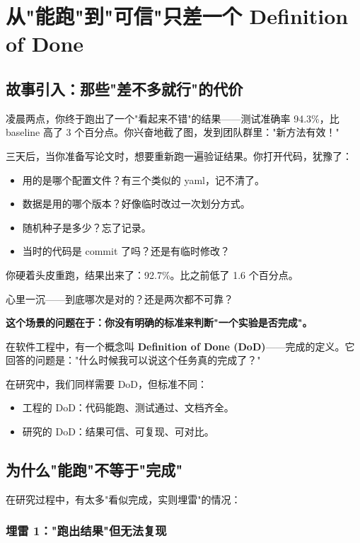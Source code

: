 \chapter{从"能跑"到"可信"只差一个 Definition of Done}
\label{ch:dod}

\section{故事引入：那些"差不多就行"的代价}

凌晨两点，你终于跑出了一个"看起来不错"的结果——测试准确率 94.3\%，比 baseline 高了 3 个百分点。你兴奋地截了图，发到团队群里："新方法有效！"

三天后，当你准备写论文时，想要重新跑一遍验证结果。你打开代码，犹豫了：

\begin{itemize}
  \item 用的是哪个配置文件？有三个类似的 yaml，记不清了。
  \item 数据是用的哪个版本？好像临时改过一次划分方式。
  \item 随机种子是多少？忘了记录。
  \item 当时的代码是 commit 了吗？还是有临时修改？
\end{itemize}

你硬着头皮重跑，结果出来了：92.7\%。比之前低了 1.6 个百分点。

心里一沉——到底哪次是对的？还是两次都不可靠？

\textbf{这个场景的问题在于：你没有明确的标准来判断"一个实验是否完成"。}

在软件工程中，有一个概念叫 \textbf{Definition of Done (DoD)}——完成的定义。它回答的问题是："什么时候我可以说这个任务真的完成了？"

在研究中，我们同样需要 DoD，但标准不同：
\begin{itemize}
  \item 工程的 DoD：代码能跑、测试通过、文档齐全。
  \item 研究的 DoD：结果可信、可复现、可对比。
\end{itemize}

\section{为什么"能跑"不等于"完成"}

在研究过程中，有太多"看似完成，实则埋雷"的情况：

\subsection{埋雷 1："跑出结果"但无法复现}

